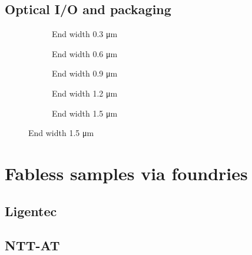 \subsection{Optical I/O and packaging}


\begin{figure}
	\centering
	\begin{subfigure}[b]{0.33\textwidth}
		
		\caption{End width 0.3 \si{\um}}
	\end{subfigure}\hfill
	\begin{subfigure}[b]{0.33\textwidth}
		
		\caption{End width 0.6 \si{\um}}
	\end{subfigure}\hfill
		\begin{subfigure}[b]{0.33\textwidth}
		
		\caption{End width 0.9 \si{\um}}
	\end{subfigure}
	\vfill
		\begin{subfigure}[b]{0.33\textwidth}
		
		\caption{End width 1.2 \si{\um}}
	\end{subfigure}
		\begin{subfigure}[b]{0.33\textwidth}
		
		\caption{End width 1.5 \si{\um}}
	\end{subfigure}

\label{fig:taper}
\end{figure}

\section{Fabless samples via foundries}

\subsection{Ligentec}

\subsection{NTT-AT}

